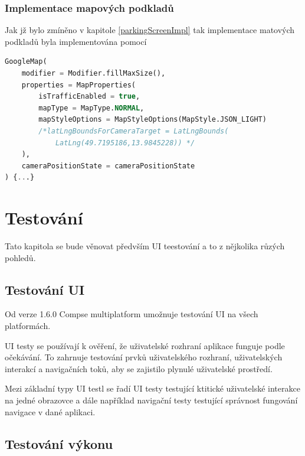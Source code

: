 \subsection{Implementace mapových podkladů}

Jak jž bylo zmíněno v kapitole \ref{parkingScreenImpl} tak implementace matových podkladů byla implementována pomocí 

\begin{lstlisting}[caption={Coil}, label={lst:Coil3}, language=SQL]
  GoogleMap(
    modifier = Modifier.fillMaxSize(),
    properties = MapProperties(
        isTrafficEnabled = true,
        mapType = MapType.NORMAL,
        mapStyleOptions = MapStyleOptions(MapStyle.JSON_LIGHT)
        /*latLngBoundsForCameraTarget = LatLngBounds(
            LatLng(49.7195186,13.9845228)) */
    ),
    cameraPositionState = cameraPositionState
) {...}
\end{lstlisting}








\chapter{Testování} \label{testsSection}
Tato kapitola se bude věnovat předvším UI teestování a to z nějkolika růzých pohledů. 

\section{Testování UI}
Od verze 1.6.0 Compse multiplatform umožnuje testování UI na všech platformách. \cite{composeNews1.6.0}

UI testy se používají k ověření, že uživatelské rozhraní aplikace funguje podle očekávání. To zahrnuje testování prvků uživatelského rozhraní, uživatelských 
interakcí a navigačních toků, aby se zajistilo plynulé uživatelské prostředí.

Mezi základní typy UI testl se řadí UI testy testující ktitické uživatelské interakce na jedné obrazovce a dále například navigační testy testující
správnost fungování navigace v dané aplikaci.


\section{Testování výkonu}


